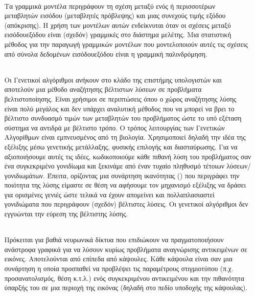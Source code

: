 \begin{description}
    \item[Γραμμικά Μοντέλα] \hfill \\ Τα γραμμικά μοντέλα περιγράφουν τη σχέση μεταξύ ενός ή περισσοτέρων μεταβλητών εισόδου (μεταβλητές πρόβλεψης) και μιας συνεχούς τιμής εξόδου (απόκρισης). Η χρήση των μοντέλων αυτών ενδείκνυται όταν οι σχέσεις μεταξύ εισόδου\textendash εξόδου είναι (σχεδόν) γραμμικές στο διάστημα μελέτης. Μια στατιστική μέθοδος για την παραγωγή γραμμικών μοντέλων που μοντελοποιούν αυτές τις σχέσεις από σύνολα δεδομένων εισόδου\textendash εξόδου είναι η γραμμική παλινδρόμηση.
     
    \item[Γενετικοί Αλγόριθμοι] \hfill \\ Οι Γενετικοί αλγόριθμοι ανήκουν στο κλάδο της επιστήμης υπολογιστών και αποτελούν μια μέθοδο αναζήτησης βέλτιστων λύσεων σε προβλήματα βελτιστοποίησης. Είναι χρήσιμοι σε περιπτώσεις όπου ο χώρος αναζήτησης λύσης είναι πολύ μεγάλος και δεν υπάρχει αναλυτική μέθοδος που να μπορεί να βρει το βέλτιστο συνδυασμό τιμών των μεταβλητών του προβλήματος ώστε το υπό εξέταση σύστημα να αντιδρά με βέλτιστο τρόπο. Ο τρόπος λειτουργίας των Γενετικών Αλγορίθμων είναι εμπνευσμένος από τη βιολογία. Χρησιμοποιεί δηλαδή την ιδέα της εξέλιξης μέσω γενετικής μετάλλαξης, φυσικής επιλογής και διασταύρωσης. Για να αξιοποιήσουμε αυτές τις ιδέες, κωδικοποιούμε κάθε πιθανή λύση του προβλήματος σαν ένα συγκεκριμένο γονιδίωμα και ξεκινάμε από έναν τυχαίο πληθυσμό τέτοιων λύσεων/γονιδιωμάτων. Έπειτα, ορίζοντας μια συνάρτηση ικανότητας () που περιγράφει την ποιότητα της λύσης είμαστε σε θέση να αφήσουμε τον μηχανισμό εξέλιξης να δράσει για ορισμένες γενιές ώστε τελικά να έχουν απομείνει και πολλαπλασιαστεί γονιδιώματα που περιγράφουν (σχεδόν) βέλτιστες λύσεις. Οι γενετικοί αλγόριθμοι δεν εγγυώνται την εύρεση της βέλτιστης λύσης.
    
    \hypertarget{_capsule_networks}{
    \item[Νευρωνικά Δίκτυα με Κάψουλες (\en{Capsule Networks})]} \hfill \\ Πρόκειται για βαθιά νευρωνικά δίκτυα που επιδιώκουν να πραγματοποιήσουν ανάστροφα γραφικά για να λύσουν κυρίως προβλήματα αναγνώρισης αντικειμένων σε εικόνες. Αποτελούνται από επίπεδα από κάψουλες. Κάθε κάψουλα είναι σαν μια συνάρτηση η οποία προσπαθεί να προβλέψει τις παραμέτρους στιγμιοτύπου (π.χ. προσανατολισμός, θέση κ.τ.λ.) ενός συγκεκριμένου αντικειμένου και την πιθανότητα ύπαρξής του σε μια περιοχή της εικόνας (δηλαδή στο πεδίο υποδοχής της κάψουλας).
    

\end{description}
